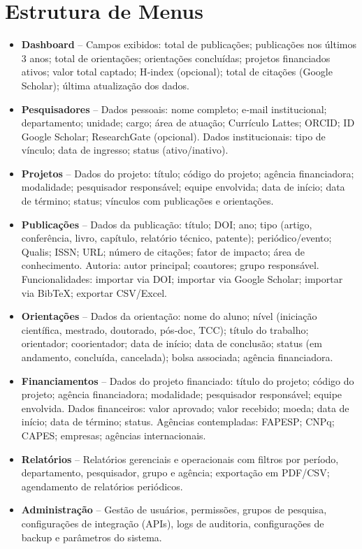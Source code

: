 \documentclass[12pt,a4paper]{article}
\begin{document}
\section{Estrutura de Menus}
\begin{itemize}[leftmargin=*]
  \item \textbf{Dashboard} -- Campos exibidos: total de publicações; publicações nos últimos 3 anos; total de orientações; orientações concluídas; projetos financiados ativos; valor total captado; H‑index (opcional); total de citações (Google Scholar); última atualização dos dados.

  \item \textbf{Pesquisadores} -- Dados pessoais: nome completo; e‑mail institucional; departamento; unidade; cargo; área de atuação; Currículo Lattes; ORCID; ID Google Scholar; ResearchGate (opcional). Dados institucionais: tipo de vínculo; data de ingresso; status (ativo/inativo).

  \item \textbf{Projetos} -- Dados do projeto: título; código do projeto; agência financiadora; modalidade; pesquisador responsável; equipe envolvida; data de início; data de término; status; vínculos com publicações e orientações.

  \item \textbf{Publicações} -- Dados da publicação: título; DOI; ano; tipo (artigo, conferência, livro, capítulo, relatório técnico, patente); periódico/evento; Qualis; ISSN; URL; número de citações; fator de impacto; área de conhecimento. Autoria: autor principal; coautores; grupo responsável. Funcionalidades: importar via DOI; importar via Google Scholar; importar via BibTeX; exportar CSV/Excel.

  \item \textbf{Orientações} -- Dados da orientação: nome do aluno; nível (iniciação científica, mestrado, doutorado, pós‑doc, TCC); título do trabalho; orientador; coorientador; data de início; data de conclusão; status (em andamento, concluída, cancelada); bolsa associada; agência financiadora.

  \item \textbf{Financiamentos} -- Dados do projeto financiado: título do projeto; código do projeto; agência financiadora; modalidade; pesquisador responsável; equipe envolvida. Dados financeiros: valor aprovado; valor recebido; moeda; data de início; data de término; status. Agências contempladas: FAPESP; CNPq; CAPES; empresas; agências internacionais.

  \item \textbf{Relatórios} -- Relatórios gerenciais e operacionais com filtros por período, departamento, pesquisador, grupo e agência; exportação em PDF/CSV; agendamento de relatórios periódicos.

  \item \textbf{Administração} -- Gestão de usuários, permissões, grupos de pesquisa, configurações de integração (APIs), logs de auditoria, configurações de backup e parâmetros do sistema.
\end{itemize}
\end{document}
